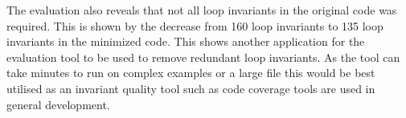 The evaluation also reveals that not all loop invariants in the original
code was required.
This is shown by the decrease from 160 loop invariants to 135 loop invariants
in the minimized code.
This shows another application for the evaluation tool to be used to remove redundant
loop invariants.
As the tool can take minutes to run on complex examples or a large file this
would be best utilised as an invariant quality tool such as code coverage tools
are used in general development.
